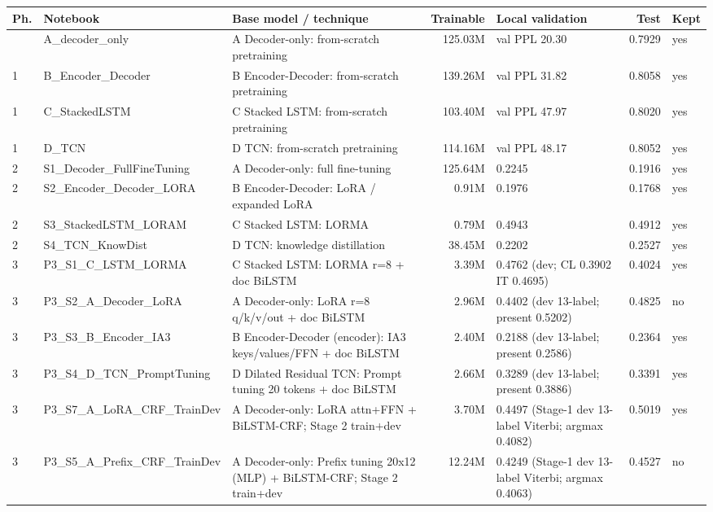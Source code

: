 \begin{longtable}{@{}l p{4.1cm} p{5.2cm} r p{3.0cm} r l@{}}
\toprule Ph. & Notebook & Base model / technique & Trainable & Local validation & Test & Kept \\ \midrule \endhead
\bottomrule \endfoot
1 & A\_decoder\_only & A Decoder-only: from-scratch pretraining & 125.03M & val PPL 20.30 & 0.7929 & yes \\
1 & B\_Encoder\_Decoder & B Encoder-Decoder: from-scratch pretraining & 139.26M & val PPL 31.82 & 0.8058 & yes \\
1 & C\_StackedLSTM & C Stacked LSTM: from-scratch pretraining & 103.40M & val PPL 47.97 & 0.8020 & yes \\
1 & D\_TCN & D TCN: from-scratch pretraining & 114.16M & val PPL 48.17 & 0.8052 & yes \\
2 & S1\_Decoder\_FullFineTuning & A Decoder-only: full fine-tuning & 125.64M & 0.2245 & 0.1916 & yes \\
2 & S2\_Encoder\_Decoder\_LORA & B Encoder-Decoder: LoRA / expanded LoRA & 0.91M & 0.1976 & 0.1768 & yes \\
2 & S3\_StackedLSTM\_LORAM & C Stacked LSTM: LORMA & 0.79M & 0.4943 & 0.4912 & yes \\
2 & S4\_TCN\_KnowDist & D TCN: knowledge distillation & 38.45M & 0.2202 & 0.2527 & yes \\
3 & P3\_S1\_C\_LSTM\_LORMA & C Stacked LSTM: LORMA r=8 + doc BiLSTM & 3.39M & 0.4762 (dev; CL 0.3902 IT 0.4695) & 0.4024 & yes \\
3 & P3\_S2\_A\_Decoder\_LoRA & A Decoder-only: LoRA r=8 q/k/v/out + doc BiLSTM & 2.96M & 0.4402 (dev 13-label; present 0.5202) & 0.4825 & no \\
3 & P3\_S3\_B\_Encoder\_IA3 & B Encoder-Decoder (encoder): IA3 keys/values/FFN + doc BiLSTM & 2.40M & 0.2188 (dev 13-label; present 0.2586) & 0.2364 & yes \\
3 & P3\_S4\_D\_TCN\_PromptTuning & D Dilated Residual TCN: Prompt tuning 20 tokens + doc BiLSTM & 2.66M & 0.3289 (dev 13-label; present 0.3886) & 0.3391 & yes \\
3 & P3\_S7\_A\_LoRA\_CRF\_TrainDev & A Decoder-only: LoRA attn+FFN + BiLSTM-CRF; Stage 2 train+dev & 3.70M & 0.4497 (Stage-1 dev 13-label Viterbi; argmax 0.4082) & 0.5019 & yes \\
3 & P3\_S5\_A\_Prefix\_CRF\_TrainDev & A Decoder-only: Prefix tuning 20x12 (MLP) + BiLSTM-CRF; Stage 2 train+dev & 12.24M & 0.4249 (Stage-1 dev 13-label Viterbi; argmax 0.4063) & 0.4527 & no \\

\end{longtable}
